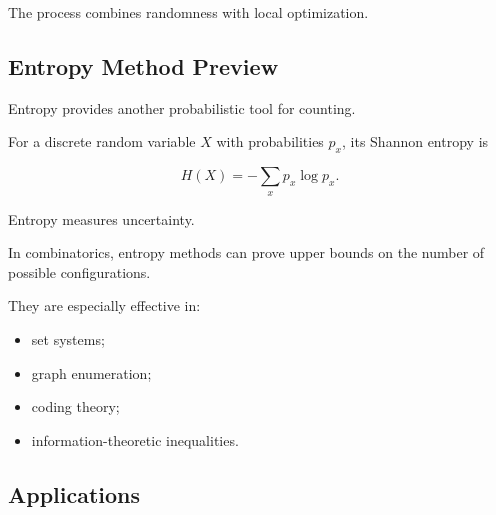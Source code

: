The process combines randomness with local optimization.

\subsection{Entropy Method Preview}
\label{subsec:entropy-method-preview}

Entropy provides another probabilistic tool for counting.

For a discrete random variable \(X\) with probabilities \(p_x\), its
Shannon entropy is

\[
\boxed{
H(X)
=
-\sum_x p_x\log p_x.
}
\]

Entropy measures uncertainty.

In combinatorics, entropy methods can prove upper bounds on the number
of possible configurations.

They are especially effective in:

\begin{itemize}
    \item set systems;
    \item graph enumeration;
    \item coding theory;
    \item information-theoretic inequalities.
\end{itemize}

\subsection{Applications}
\label{subsec:probabilistic-combinatorics-applications}

